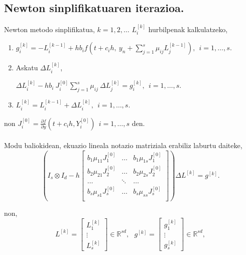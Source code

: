 \subsection*{Newton sinplifikatuaren iterazioa.}

Newton metodo sinplifikatua, $k=1,2,\dots$  $L_i^{[k]}$ hurbilpenak kalkulatzeko,
\begin{enumerate}
\item 
$g_i^{[k]}=-L_i^{[k-1]}+h b_i f(t+c_ih,\ y_n+ \sum\limits_{j=1}^{s} \mu_{ij} L_{j}^{[k-1]}), \ \ i=1,\dots,s.$

\item Askatu $\Delta L_i^{[k]}$,

$\Delta L_i^{[k]} - h b_i \ J_i^{[0]} \sum_{j=1}^{s} \mu_{ij}  \ \Delta L_j^{[k]} = g_i^{[k]}  , \ \ i=1,\dots,s.$

\item $L_i^{[k]} = L_i^{[k-1]}+ \Delta L_i^{[k]}, \ \  i=1,\dots,s.$

\end{enumerate}
non $J_i^{[0]}=\frac{\partial f}{\partial y} (t+c_ih, Y_i^{[0]}) \ \  i=1,\dots,s$ den.

\paragraph*{}Modu baliokidean, ekuazio lineala notazio matriziala erabiliz laburtu daiteke,
\begin{equation*}
\left (I_s \otimes I_d - h  
\begin{bmatrix}
b_1 \mu_{11} J_1^{[0]} & \dots & b_1 \mu_{1s} J_1^{[0]} \\
b_2 \mu_{21} J_2^{[0]} & \dots & b_2 \mu_{2s} J_2^{[0]} \\
\dots          & \ddots & \dots \\
b_s \mu_{s1} J_s^{[0]} & \dots & b_s \mu_{ss} J_s^{[0]} \\ 
\end{bmatrix} \right) \Delta L^{[k]} =g^{[k]}.
\end{equation*}

non,
\begin{equation*}
L^{[k]}=\begin{bmatrix}
L_1^{[k]} \\
\vdots \\
L_s^{[k]}
\end{bmatrix} \in \mathbb{R}^{sd}, \ \ \
g^{[k]}=\begin{bmatrix}
g_1^{[k]} \\
\vdots \\
g_s^{[k]}
\end{bmatrix} \in \mathbb{R}^{sd},  
\end{equation*}

